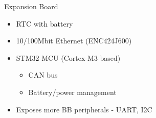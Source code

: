 \documentclass{beamer}
\begin{document}
\begin{frame}{Expansion Board}
\begin{itemize}
	\item RTC with battery
	\item 10/100Mbit Ethernet (ENC424J600)
	\item STM32 MCU (Cortex-M3 based) \begin{itemize}
	\item CAN bus
	\item Battery/power management
\end{itemize}
\item Exposes more BB peripherals - UART, I2C
\end{itemize}
\end{frame}
\end{document}
